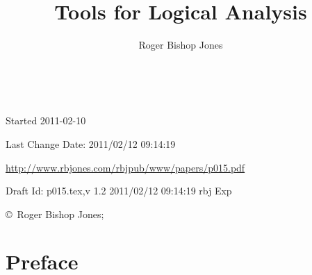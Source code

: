 \documentclass[10pt,titlepage]{book}
\title{Tools for Logical Analysis}
\author{Roger Bishop Jones}
\date{\ }
\begin{document}
\frontmatter

\begin{titlepage}
\maketitle

\vfill


\begin{centering}


\vfill

\footnotesize{
Started 2011-02-10

Last Change $ $Date: 2011/02/12 09:14:19 $ $

\href{http://www.rbjones.com/rbjpub/www/papers/p015.pdf}{http://www.rbjones.com/rbjpub/www/papers/p015.pdf}

Draft $ $Id: p015.tex,v 1.2 2011/02/12 09:14:19 rbj Exp $ $

\copyright\ Roger Bishop Jones;

}%
\end{centering}

\thispagestyle{empty}
\end{titlepage}

{\parskip=0pt\tableofcontents}


\mainmatter

\section*{Preface}



\backmatter




\label{index}
\twocolumn[]
{\small\printindex}
\end{document}
